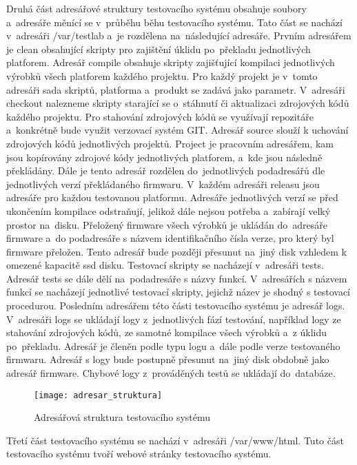Druhá část adresářové struktury testovacího systému obsahuje soubory a~adresáře měnící se v~průběhu běhu testovacího systému. Tato část se nachází v~adresáři /var/testlab a~je rozdělena na~následující adresáře. Prvním adresářem je clean obsahující skripty pro zajištění úklidu po~překladu jednotlivých platforem. Adresář compile obsahuje skripty zajišťující kompilaci jednotlivých výrobků všech platforem každého projektu. Pro každý projekt je v~tomto adresáři sada skriptů, platforma a~produkt se zadává jako parametr. V~adresáři checkout nalezneme skripty starající se o~stáhnutí či aktualizaci zdrojových kódů každého projektu. Pro stahování zdrojových kódů se využívají repozitáře a~konkrétně bude využit verzovací systém GIT. Adresář source slouží k uchování zdrojových kódů jednotlivých projektů. Project je pracovním adresářem, kam jsou kopírovány zdrojové kódy jednotlivých platforem, a~kde jsou následně překládány. Dále je tento adresář rozdělen do~jednotlivých podadresářů dle jednotlivých verzí překládaného firmwaru. V~každém adresáři releasu jsou adresáře pro každou testovanou platformu. Adresáře jednotlivých verzí se před ukončením kompilace odstraňují, jelikož dále nejsou potřeba a~zabírají velký prostor na~disku. Přeložený firmware všech výrobků je ukládán do~adresáře firmware a~do podadresáře s názvem identifikačního čísla verze, pro který byl firmware přeložen. Tento adresář bude později přesunut na~jiný disk vzhledem k omezené kapacitě ssd disku. Testovací skripty se nacházejí v~adresáři tests. Adresář tests se dále dělí na~podadresáře s názvy funkcí. V~adresářích s názvem funkcí se nacházejí jednotlivé testovací skripty, jejichž název je shodný s testovací procedurou. Posledním adresářem této části testovacího systému je adresář logs. V~adresáři logs se ukládají logy z~jednotlivých fází testování, například logy ze stahování zdrojových kódů, ze samotné kompilace všech výrobků a~z úklidu po~překladu. Adresář je členěn podle typu logu a~dále podle verze testovaného firmwaru. Adresář s logy bude postupně přesunut na~jiný disk obdobně jako adresář firmware. Chybové logy z~prováděných testů se ukládají do~databáze.

\begin{figure}[h]
  \centering
  \texttt{[image: adresar\_struktura]}
  \caption{Adresářová struktura testovacího systému}
  \label{fig:adresar_struktura}
\end{figure}

Třetí část testovacího systému se nachází v~adresáři /var/www/html. Tuto část testovacího systému tvoří webové stránky testovacího systému.

